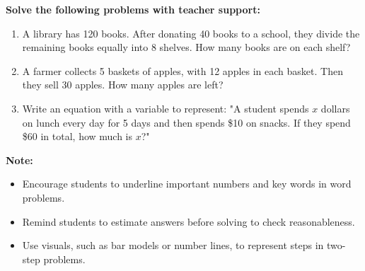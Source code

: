 \documentclass[12pt]{article}
\begin{document}
\begin{tcolorbox}[colframe=black!60, colback=white, 
coltitle=black, colbacktitle=black!15, fonttitle=\bfseries\Large, 
title=Guided Practice, halign title=center, left=10pt, right=10pt, top=10pt, bottom=15pt]
\textbf{Solve the following problems with teacher support:}
\begin{enumerate}[itemsep=5em]
    \item A library has 120 books. After donating 40 books to a school, they divide the remaining books equally into 8 shelves. How many books are on each shelf?
    \item A farmer collects 5 baskets of apples, with 12 apples in each basket. Then they sell 30 apples. How many apples are left?
    \item Write an equation with a variable to represent: "A student spends $x$ dollars on lunch every day for 5 days and then spends \$10 on snacks. If they spend \$60 in total, how much is $x$?"
    \vspace{3 cm}
\end{enumerate}
\end{tcolorbox}

\vspace{2em}

\begin{tcolorbox}[colframe=black!40, colback=gray!5, 
coltitle=black, colbacktitle=black!20, fonttitle=\bfseries\Large, 
title=Additional Notes, halign title=center, left=5pt, right=5pt, top=5pt, bottom=15pt]
\textbf{Note:}
\begin{itemize}
    \item Encourage students to underline important numbers and key words in word problems.
    \item Remind students to estimate answers before solving to check reasonableness.
    \item Use visuals, such as bar models or number lines, to represent steps in two-step problems.
\end{itemize}
\end{tcolorbox}

\vspace{1em}
\end{document}
